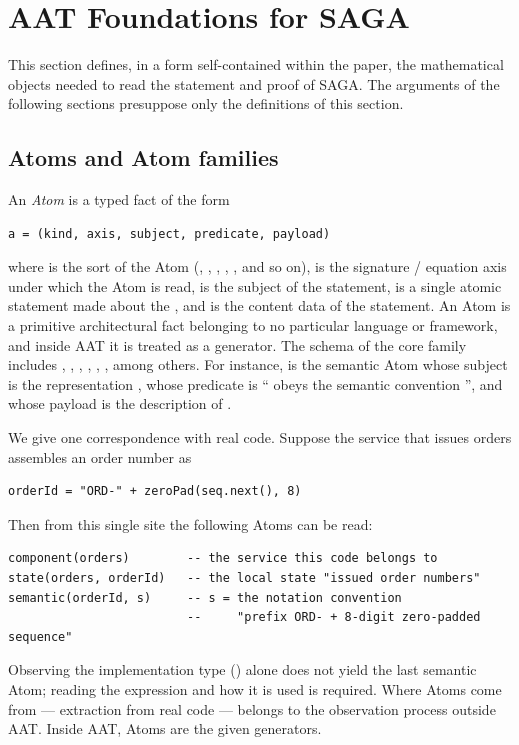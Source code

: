 \section{AAT Foundations for SAGA}\label{sec:3}

This section defines, in a form self-contained within the paper, the
mathematical objects needed to read the statement and proof of SAGA. The
arguments of the following sections presuppose only the definitions of
this section.

\subsection{Atoms and Atom families}\label{sec:31}

\begin{definition}[Atom]\label{def:atom}
An \emph{Atom} is a typed fact of the form
\begin{verbatim}
a = (kind, axis, subject, predicate, payload)
\end{verbatim}
where  is the sort of the Atom (,
, , , , and so
on),  is the signature / equation axis under which the Atom is
read,  is the subject of the statement,  is
a single atomic statement made about the , and
 is the content data of the statement. An Atom is a
primitive architectural fact belonging to no particular language or
framework, and inside AAT it is treated as a generator. The schema of the
core family includes , ,
, , ,
, among others. For instance,
 is the semantic Atom whose subject is the
representation , whose predicate is `` obeys the semantic
convention '', and whose payload is the description of .
\end{definition}

We give one correspondence with real code. Suppose the service that
issues orders assembles an order number as
\begin{verbatim}
orderId = "ORD-" + zeroPad(seq.next(), 8)
\end{verbatim}
Then from this single site the following Atoms can be read:
\begin{verbatim}
component(orders)        -- the service this code belongs to
state(orders, orderId)   -- the local state "issued order numbers"
semantic(orderId, s)     -- s = the notation convention
                         --     "prefix ORD- + 8-digit zero-padded sequence"
\end{verbatim}
Observing the implementation type () alone does not yield
the last semantic Atom; reading the expression and how it is used is
required. Where Atoms come from --- extraction from real code --- belongs
to the observation process outside AAT. Inside AAT, Atoms are the given
generators.

